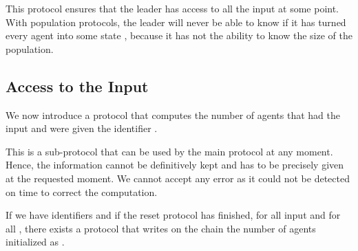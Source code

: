 \documentclass[UKenglish]{llncs}
\begin{document}
This protocol ensures that the leader has access to all the input
at some point. With population protocols, the leader will never be able to know
if it has turned every agent into some state , because it has not the
ability to know the size of the population.



\subsection{Access to the Input} 

We now
introduce a protocol that computes the number of agents
that had the input  and were given the identifier .

This is a sub-protocol that can be used by the
main protocol at any moment. Hence, the information cannot be definitively kept 
and has to be precisely given  at the requested moment.
We cannot accept any error as it could not be detected on time to correct the computation.



\begin{proposition}\label{prop:sid}
If we have  identifiers and 
if the reset protocol has finished,
for all input  and for all ,
there exists a protocol that writes on the chain the number of agents initialized
as .  
\end{proposition}
\end{document}
